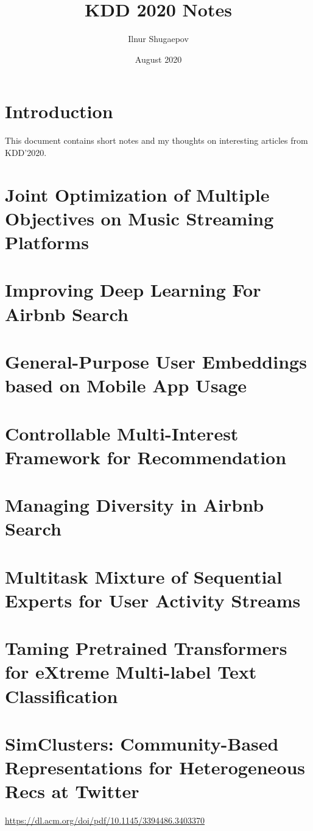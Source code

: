 \documentclass[11pt]{article}
\title{KDD 2020 Notes}
\author{Ilnur Shugaepov \\ \durl{VK.com}}
\date{August 2020}
\begin{document}
\maketitle
\tableofcontents
\newpage

\section*{Introduction}
This document contains short notes and my thoughts on interesting articles from KDD'2020.


\section{Joint Optimization of Multiple Objectives on Music Streaming Platforms~\cite{rishabh2020multiobjective}}

\section{Improving Deep Learning For Airbnb Search~\cite{haldar2020improving}}

\section{General-Purpose User Embeddings based on Mobile App Usage~\cite{zhang2020general}}

\section{Controllable Multi-Interest Framework for Recommendation}

\section{Managing Diversity in Airbnb Search}

\section{Multitask Mixture of Sequential Experts for User Activity Streams}

\section{Taming Pretrained Transformers for eXtreme Multi-label Text Classification}

\section{SimClusters: Community-Based Representations for Heterogeneous Recs at Twitter}
\url{https://dl.acm.org/doi/pdf/10.1145/3394486.3403370}
\end{document}
